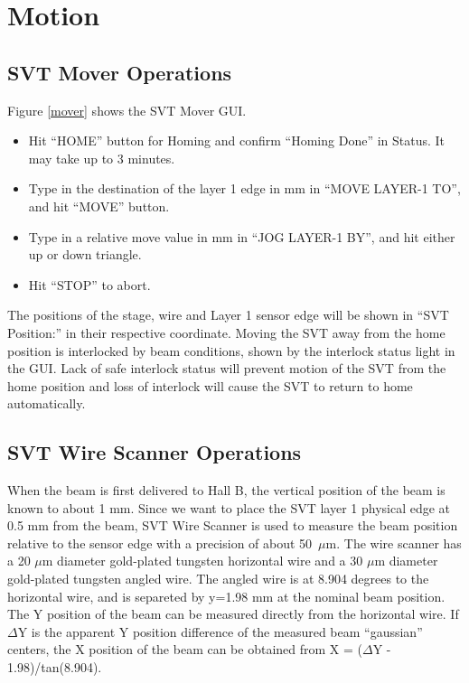 \documentclass[12pt]{report}
\begin{document}


\section{Motion}

\subsection{SVT Mover Operations}

Figure \ref{mover} shows the SVT Mover GUI.

\begin{itemize}
\item
Hit ``HOME'' button for Homing and confirm ``Homing Done'' in Status. It may take up to 3 minutes.
\item
Type in the destination of the layer 1 edge in mm in ``MOVE LAYER-1 TO'', and hit ``MOVE'' button.
\item
Type in a relative move value in mm in ``JOG LAYER-1 BY'', and hit either up or down triangle.
\item
Hit ``STOP'' to abort.
\end{itemize}

The positions of the stage, wire and Layer 1 sensor edge will be shown in ``SVT Position:'' in their respective coordinate.  Moving the SVT away from the home position is interlocked by beam conditions, shown by the interlock status light in the GUI.  Lack of safe interlock status will prevent motion of the SVT from the home position and loss of interlock will cause the SVT to return to home automatically.

\subsection{SVT Wire Scanner Operations}

When the beam is first delivered to Hall B, the vertical position of the beam is known to about 1 mm. Since we want to place the SVT layer 1 physical edge at 0.5 mm from the beam, SVT Wire Scanner is used to measure the beam position relative to the sensor edge with a precision of about 50~$\mu$m. The wire scanner has a 20 $\mu$m diameter gold-plated tungsten horizontal wire and a 30 $\mu$m diameter gold-plated tungsten angled wire. The angled wire is at 8.904 degrees to the horizontal wire, and is separeted by y=1.98 mm at the nominal beam position. The Y position of the beam can be measured directly from the horizontal wire. If $\Delta$Y is the apparent Y position difference of the measured beam ``gaussian'' centers, the X position of the beam can be obtained from X = ($\Delta$Y - 1.98)/tan(8.904).      
\end{document}
